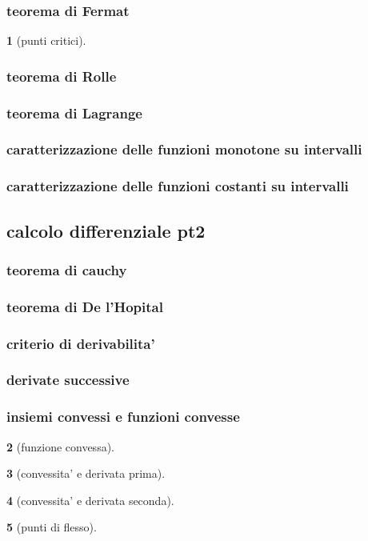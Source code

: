 \documentclass{article}
\theoremstyle{mystyle}
\newtheorem*{mydefinition}{}
\begin{document}
\subsubsection{teorema di Fermat}
\begin{mydefinition}[punti critici]
    
\end{mydefinition}
\subsubsection{teorema di Rolle}
\subsubsection{teorema di Lagrange}
\subsubsection{caratterizzazione delle funzioni monotone su intervalli}
\subsubsection{caratterizzazione delle funzioni costanti su intervalli}
\subsection{calcolo differenziale pt2}
\subsubsection{teorema di cauchy}
\subsubsection{teorema di De l'Hopital}
\subsubsection{criterio di derivabilita'}
\subsubsection{derivate successive}
\subsubsection{insiemi convessi e funzioni convesse}
\begin{mydefinition}[funzione convessa]
    
\end{mydefinition}
\begin{mydefinition}[convessita' e derivata prima]
    
\end{mydefinition}
\begin{mydefinition}[convessita' e derivata seconda]
    
\end{mydefinition}
\begin{mydefinition}[punti di flesso]
    
\end{mydefinition}
\end{document}
